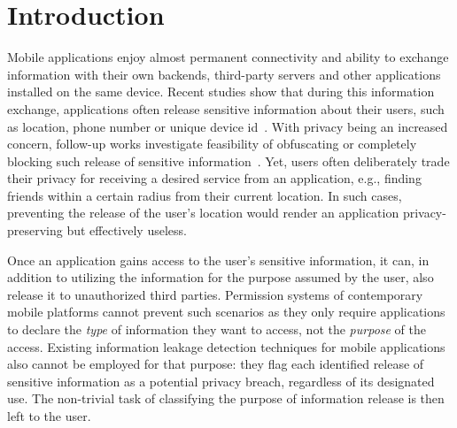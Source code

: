 \section{Introduction}
\label{sec:intro} 
Mobile applications enjoy almost permanent connectivity and ability to exchange information with their own backends, third-party servers and other applications installed on the same device. 
Recent studies show that during this information exchange, applications often release sensitive information about their users, such as location, phone number or unique device id~\cite{Enck:Gilbert:Chun:Cox:Jung:McDaniel:Sheth:OSDI10, Egele:Kruegel:Kirda:Vign:NDSS11,Tripp:Rubin:SEC14}. 
With privacy being an increased concern, follow-up works investigate feasibility of obfuscating or completely blocking such release of sensitive information~\cite{Hornyack:Han:Jung:Schechter:Wetherall:CCS11}.
Yet, users often deliberately trade their privacy for receiving a desired service from an application, 
e.g., finding friends within a certain radius from their current location. 
In such cases, preventing the release of the user's location would render an application privacy-preserving but effectively useless. 

Once an application gains access to the user's sensitive information, it can, in addition to utilizing the information for the purpose assumed by the user, also release it to unauthorized third parties.
Permission systems of contemporary mobile platforms cannot prevent such scenarios as they only require applications to declare the \emph{type} of information they want to access, not the \emph{purpose} of the access. 
Existing information leakage detection techniques for mobile applications~\cite{Enck:Gilbert:Chun:Cox:Jung:McDaniel:Sheth:OSDI10,Egele:Kruegel:Kirda:Vign:NDSS11,Arzt:Rasthofer:Fritz:Bodden:Bartel:Klein:Traon:Octeau:McDaniel:PLDI14, Tripp:Rubin:SEC14,DroidSafe} 
also cannot be employed for that purpose: they flag each identified release of sensitive information as a potential privacy breach, regardless of its designated use. 
The non-trivial task of classifying the purpose of information release is then left to the user. 


